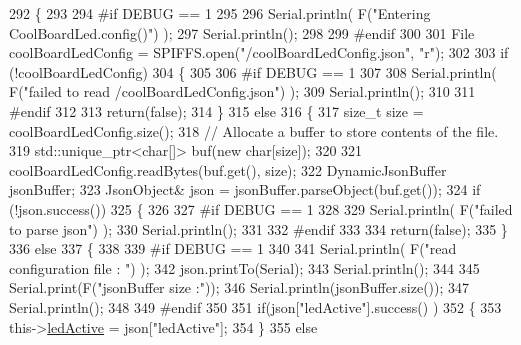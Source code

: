 \begin{DoxyCode}
292 \{
293 
294 \textcolor{preprocessor}{#if DEBUG == 1 }
295         
296     Serial.println( F(\textcolor{stringliteral}{"Entering CoolBoardLed.config()"}) );
297     Serial.println();
298 
299 \textcolor{preprocessor}{#endif}
300     
301     File coolBoardLedConfig = SPIFFS.open(\textcolor{stringliteral}{"/coolBoardLedConfig.json"}, \textcolor{stringliteral}{"r"});
302 
303     \textcolor{keywordflow}{if} (!coolBoardLedConfig) 
304     \{
305     
306 \textcolor{preprocessor}{    #if DEBUG == 1}
307 
308         Serial.println( F(\textcolor{stringliteral}{"failed to read /coolBoardLedConfig.json"}) );
309         Serial.println();
310 
311 \textcolor{preprocessor}{    #endif}
312 
313         \textcolor{keywordflow}{return}(\textcolor{keyword}{false});
314     \}
315     \textcolor{keywordflow}{else}
316     \{
317         \textcolor{keywordtype}{size\_t} size = coolBoardLedConfig.size();
318         \textcolor{comment}{// Allocate a buffer to store contents of the file.}
319         std::unique\_ptr<char[]> buf(\textcolor{keyword}{new} \textcolor{keywordtype}{char}[size]);
320 
321         coolBoardLedConfig.readBytes(buf.get(), size);
322         DynamicJsonBuffer jsonBuffer;
323         JsonObject& json = jsonBuffer.parseObject(buf.get());
324         \textcolor{keywordflow}{if} (!json.success()) 
325         \{
326         
327 \textcolor{preprocessor}{        #if DEBUG == 1}
328 
329             Serial.println( F(\textcolor{stringliteral}{"failed to parse json"}) );
330             Serial.println();
331         
332 \textcolor{preprocessor}{        #endif}
333 
334             \textcolor{keywordflow}{return}(\textcolor{keyword}{false});
335         \} 
336         \textcolor{keywordflow}{else}
337         \{
338         
339 \textcolor{preprocessor}{        #if DEBUG == 1}
340     
341             Serial.println( F(\textcolor{stringliteral}{"read configuration file : "}) );
342             json.printTo(Serial);
343             Serial.println();
344             
345             Serial.print(F(\textcolor{stringliteral}{"jsonBuffer size :"}));
346             Serial.println(jsonBuffer.size());
347             Serial.println();
348 
349 \textcolor{preprocessor}{        #endif}
350   
351             \textcolor{keywordflow}{if}(json[\textcolor{stringliteral}{"ledActive"}].success() )
352             \{
353                 this->\hyperlink{classCoolBoardLed_a5f17c135516fcf4b44ea8a096ba0177a}{ledActive} = json[\textcolor{stringliteral}{"ledActive"}]; 
354             \}
355             \textcolor{keywordflow}{else}

\end{DoxyCode}
